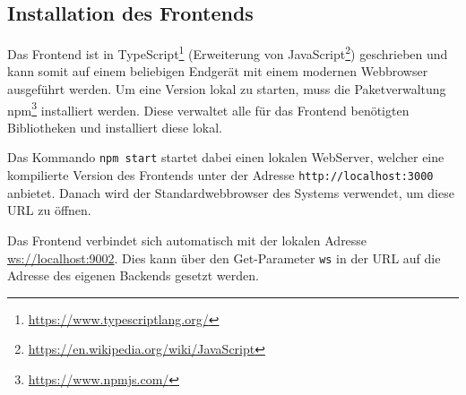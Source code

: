 \subsection{Installation des Frontends}
Das Frontend ist in TypeScript\footnote{\url{https://www.typescriptlang.org/}} (Erweiterung von JavaScript\footnote{\url{https://en.wikipedia.org/wiki/JavaScript}})
geschrieben und kann somit auf einem beliebigen Endgerät mit einem modernen Webbrowser ausgeführt werden.
Um eine Version lokal zu starten, muss die Paketverwaltung npm\footnote{\url{https://www.npmjs.com/}} installiert werden. Diese verwaltet alle
für das Frontend benötigten Bibliotheken und installiert diese lokal.

Das Kommando \verb|npm start| startet dabei einen lokalen WebServer, welcher eine kompilierte Version des Frontends
unter der Adresse \verb|http://localhost:3000| anbietet. Danach wird der Standardwebbrowser des Systems verwendet, um diese
URL zu öffnen.

Das Frontend verbindet sich automatisch mit der lokalen Adresse \url{ws://localhost:9002}.
Dies kann über den Get-Parameter \verb|ws| in der URL auf die Adresse des eigenen Backends gesetzt werden.